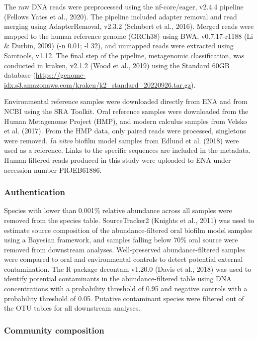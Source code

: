 \documentclass[
]{article}
\begin{document}
The raw DNA reads were preprocessed using the nf-core/eager, v2.4.4
pipeline (Fellows Yates et al., 2020). The pipeline included adapter
removal and read merging using AdapterRemoval, v2.3.2 (Schubert et al.,
2016). Merged reads were mapped to the human reference genome (GRCh38)
using BWA, v0.7.17-r1188 (Li \& Durbin, 2009) (-n 0.01; -l 32), and
unmapped reads were extracted using Samtools, v1.12. The final step of
the pipeline, metagenomic classification, was conducted in kraken,
v2.1.2 (Wood et al., 2019) using the Standard 60GB database
(\url{https://genome-idx.s3.amazonaws.com/kraken/k2_standard_20220926.tar.gz}).

Environmental reference samples were downloaded directly from ENA and
from NCBI using the SRA Toolkit. Oral reference samples were downloaded
from the Human Metagenome Project (HMP), and modern calculus samples
from Velsko et al. (2017). From the HMP data, only paired reads were
processed, singletons were removed. \emph{In vitro} biofilm model
samples from Edlund et al. (2018) were used as a reference. Links to the
specific sequences are included in the metadata. Human-filtered reads
produced in this study were uploaded to ENA under accession number
PRJEB61886.

\hypertarget{authentication}{%
\subsubsection{Authentication}\label{authentication}}

Species with lower than 0.001\% relative abundance across all samples
were removed from the species table. SourceTracker2 (Knights et al.,
2011) was used to estimate source composition of the abundance-filtered
oral biofilm model samples using a Bayesian framework, and samples
falling below 70\% oral source were removed from downstream analyses.
Well-preserved abundance-filtered samples were compared to oral and
environmental controls to detect potential external contamination. The R
package decontam v1.20.0 (Davis et al., 2018) was used to identify
potential contaminants in the abundance-filtered table using DNA
concentrations with a probability threshold of 0.95 and negative
controls with a probability threshold of 0.05. Putative contaminant
species were filtered out of the OTU tables for all downstream analyses.

\hypertarget{community-composition}{%
\subsubsection{Community composition}\label{community-composition}}
\end{document}
